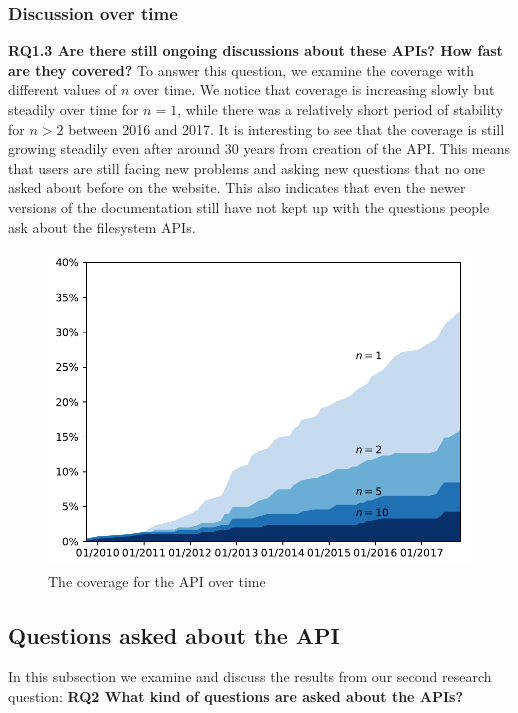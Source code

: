 \subsubsection{Discussion over time}
\textbf{RQ1.3 Are there still ongoing discussions about these APIs? How fast are they covered?}
To answer this question, we examine the coverage with different values of $n$ over time. We notice that coverage is increasing slowly but steadily over time for $n=1$, while there was a relatively short period of stability for $n>2$ between 2016 and 2017. It is interesting to see that the coverage is still growing steadily even after around 30 years from creation of the API. This means that users are still facing new problems and asking new questions that no one asked about before on the website. This also indicates that even the newer versions of the documentation still have not kept up with the questions people ask about the filesystem APIs.

\begin{figure}[t!]
  \centering
  \includegraphics[width=\columnwidth]{scripts/figures/1-3-coverage-by-time}
  \caption{The coverage for the API over time}
  \label{fig:coveragetime}
\end{figure}

\subsection{Questions asked about the API}
In this subsection we examine and discuss the results from our second research question: \textbf{RQ2 What kind of questions are asked about the APIs?}

